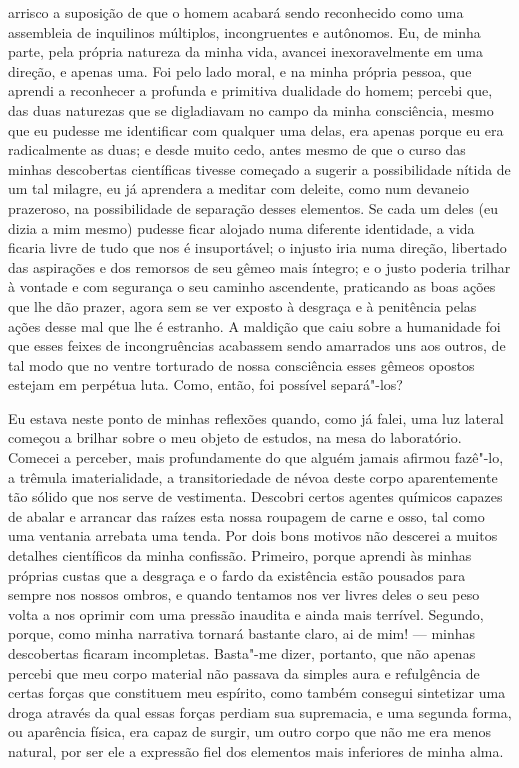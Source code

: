 arrisco a suposição de que o homem acabará sendo reconhecido como uma
assembleia de inquilinos múltiplos, incongruentes e autônomos. Eu, de
minha parte, pela própria natureza da minha vida, avancei
inexoravelmente em uma direção, e apenas uma.  Foi pelo lado moral, e
na minha própria pessoa, que aprendi a reconhecer a profunda e
primitiva dualidade do homem; percebi que, das duas naturezas que se
digladiavam no campo da minha consciência, mesmo que eu pudesse me
identificar com qualquer uma delas, era apenas porque eu era
radicalmente as duas; e desde muito cedo, antes mesmo de que o curso
das minhas descobertas científicas tivesse começado a sugerir a
possibilidade nítida de um tal milagre, eu já aprendera a meditar com
deleite, como num devaneio prazeroso, na possibilidade de separação
desses elementos.  Se cada um deles (eu dizia a mim mesmo) pudesse
ficar alojado numa diferente identidade, a vida ficaria livre de tudo
que nos é insuportável; o injusto iria numa direção, libertado das
aspirações e dos remorsos de seu gêmeo mais íntegro; e o justo poderia
trilhar à vontade e com segurança o seu caminho ascendente, praticando
as boas ações que lhe dão prazer, agora sem se ver exposto à desgraça e
à penitência pelas ações desse mal que lhe é estranho.  A maldição que
caiu sobre a humanidade foi que esses feixes de incongruências
acabassem sendo amarrados uns aos outros, de tal modo que no ventre
torturado de nossa consciência esses gêmeos opostos estejam em perpétua
luta.  Como, então, foi possível separá"-los?

Eu estava neste ponto de minhas reflexões quando, como já falei, uma luz
lateral começou a brilhar sobre o meu objeto de estudos, na mesa do
laboratório.  Comecei a perceber, mais profundamente do que alguém
jamais afirmou fazê"-lo, a trêmula imaterialidade, a transitoriedade de
névoa deste corpo aparentemente tão sólido que nos serve de vestimenta.
 Descobri certos agentes químicos capazes de abalar e arrancar das
raízes esta nossa roupagem de carne e osso, tal como uma ventania
arrebata uma tenda.  Por dois bons motivos não descerei a muitos
detalhes científicos da minha confissão.  Primeiro, porque aprendi às
minhas próprias custas que a desgraça e o fardo da existência estão
pousados para sempre nos nossos ombros, e quando tentamos nos ver
livres deles o seu peso volta a nos oprimir com uma pressão inaudita e
ainda mais terrível.  Segundo, porque, como minha narrativa tornará
bastante claro, ai de mim! --- minhas descobertas ficaram incompletas. 
Basta"-me dizer, portanto, que não apenas percebi que meu corpo material
não passava da simples aura e refulgência de certas forças que
constituem meu espírito, como também consegui sintetizar uma droga
através da qual essas forças perdiam sua supremacia, e uma segunda
forma, ou aparência física, era capaz de surgir, um outro corpo que não
me era menos natural, por ser ele a expressão fiel dos elementos mais
inferiores de minha alma.

